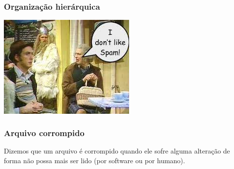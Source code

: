 \begin{frame}
\frametitle{Organização hierárquica}
\begin{minipage}{0.47\textwidth}
\end{minipage}
\hfill
\begin{minipage}{0.47\textwidth}
\includegraphics[width=\linewidth,height=0.5\textheight,keepaspectratio]{figures/mp-spam.jpg}
\end{minipage}
\end{frame}

\begin{frame}
\frametitle{Arquivo corrompido}
Dizemos que um arquivo é corrompido quando ele sofre alguma alteração de forma não possa mais ser lido (por software ou por humano). 
\end{frame}

